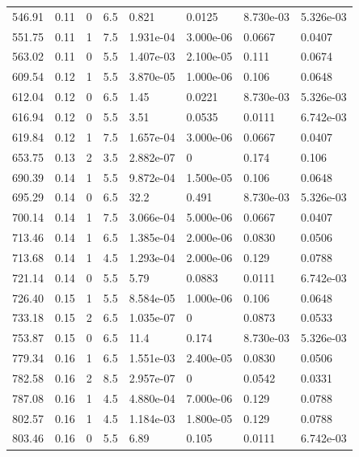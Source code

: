 \documentclass[preview]{standalone}
\begin{document}
{{{\begin{tabular}{L{1.2cm}C{1.2cm} C{0.3cm}C{0.5cm} C{1.4cm}C{1.4cm} C{1.4cm}C{1.4cm}}
  546.91  &  0.11  & 0     & 6.5 &  0.821  & 0.0125  & 8.730e-03 &  5.326e-03   \\ 
  551.75  &  0.11  & 1     & 7.5 &  1.931e-04  & 3.000e-06  & 0.0667 &  0.0407   \\ 
  563.02  &  0.11  & 0     & 5.5 &  1.407e-03  & 2.100e-05  & 0.111 &  0.0674   \\ 
  609.54  &  0.12  & 1     & 5.5 &  3.870e-05  & 1.000e-06  & 0.106 &  0.0648   \\ 
  612.04  &  0.12  & 0     & 6.5 &  1.45  & 0.0221  & 8.730e-03 &  5.326e-03   \\ 
  616.94  &  0.12  & 0     & 5.5 &  3.51  & 0.0535  & 0.0111 &  6.742e-03   \\ 
  619.84  &  0.12  & 1     & 7.5 &  1.657e-04  & 3.000e-06  & 0.0667 &  0.0407   \\ 
  653.75  &  0.13  & 2     & 3.5 &  2.882e-07  & 0  & 0.174 &  0.106   \\ 
  690.39  &  0.14  & 1     & 5.5 &  9.872e-04  & 1.500e-05  & 0.106 &  0.0648   \\ 
  695.29  &  0.14  & 0     & 6.5 &  32.2  & 0.491  & 8.730e-03 &  5.326e-03   \\ 
  700.14  &  0.14  & 1     & 7.5 &  3.066e-04  & 5.000e-06  & 0.0667 &  0.0407   \\ 
  713.46  &  0.14  & 1     & 6.5 &  1.385e-04  & 2.000e-06  & 0.0830 &  0.0506   \\ 
  713.68  &  0.14  & 1     & 4.5 &  1.293e-04  & 2.000e-06  & 0.129 &  0.0788   \\ 
  721.14  &  0.14  & 0     & 5.5 &  5.79  & 0.0883  & 0.0111 &  6.742e-03   \\ 
  726.40  &  0.15  & 1     & 5.5 &  8.584e-05  & 1.000e-06  & 0.106 &  0.0648   \\ 
  733.18  &  0.15  & 2     & 6.5 &  1.035e-07  & 0  & 0.0873 &  0.0533   \\ 
  753.87  &  0.15  & 0     & 6.5 &  11.4  & 0.174  & 8.730e-03 &  5.326e-03   \\ 
  779.34  &  0.16  & 1     & 6.5 &  1.551e-03  & 2.400e-05  & 0.0830 &  0.0506   \\ 
  782.58  &  0.16  & 2     & 8.5 &  2.957e-07  & 0  & 0.0542 &  0.0331   \\ 
  787.08  &  0.16  & 1     & 4.5 &  4.880e-04  & 7.000e-06  & 0.129 &  0.0788   \\ 
  802.57  &  0.16  & 1     & 4.5 &  1.184e-03  & 1.800e-05  & 0.129 &  0.0788   \\ 
  803.46  &  0.16  & 0     & 5.5 &  6.89  & 0.105  & 0.0111 &  6.742e-03   \\ 

\end{tabular}}}}
\end{document}
